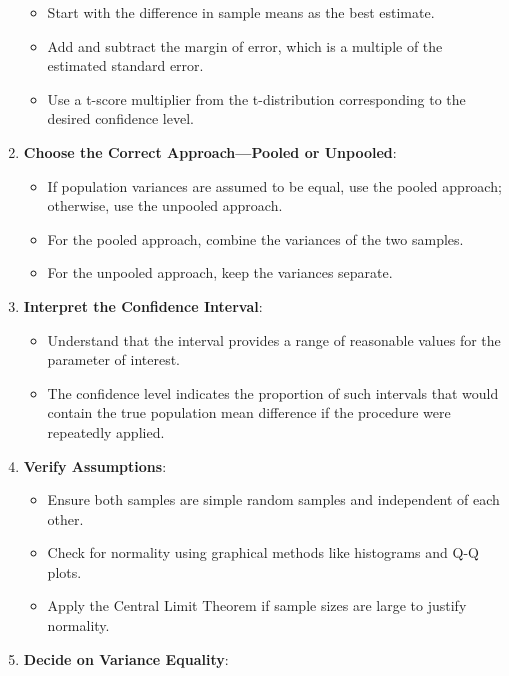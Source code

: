 \documentclass[
  letterpaper,
  DIV=11,
  numbers=noendperiod]{scrartcl}
\providecommand{\tightlist}{%
  \setlength{\itemsep}{0pt}\setlength{\parskip}{0pt}}\usepackage{longtable,booktabs,array}
\begin{document}
\begin{enumerate}
  \begin{itemize}
  \tightlist
  \item
    Start with the difference in sample means as the best estimate.
  \item
    Add and subtract the margin of error, which is a multiple of the
    estimated standard error.
  \item
    Use a t-score multiplier from the t-distribution corresponding to
    the desired confidence level.
  \end{itemize}
\item
  \textbf{Choose the Correct Approach---Pooled or Unpooled}:

  \begin{itemize}
  \tightlist
  \item
    If population variances are assumed to be equal, use the pooled
    approach; otherwise, use the unpooled approach.
  \item
    For the pooled approach, combine the variances of the two samples.
  \item
    For the unpooled approach, keep the variances separate.
  \end{itemize}
\item
  \textbf{Interpret the Confidence Interval}:

  \begin{itemize}
  \tightlist
  \item
    Understand that the interval provides a range of reasonable values
    for the parameter of interest.
  \item
    The confidence level indicates the proportion of such intervals that
    would contain the true population mean difference if the procedure
    were repeatedly applied.
  \end{itemize}
\item
  \textbf{Verify Assumptions}:

  \begin{itemize}
  \tightlist
  \item
    Ensure both samples are simple random samples and independent of
    each other.
  \item
    Check for normality using graphical methods like histograms and Q-Q
    plots.
  \item
    Apply the Central Limit Theorem if sample sizes are large to justify
    normality.
  \end{itemize}
\item
  \textbf{Decide on Variance Equality}:


\end{enumerate}
\end{document}
